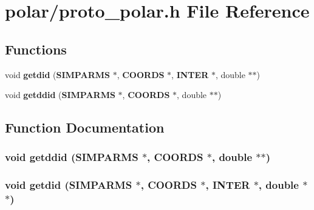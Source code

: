 \section{polar/proto\_\-polar.h File Reference}
\label{polar_2proto__polar_8h}
\subsection*{Functions}
\begin{CompactItemize}
\item 
void {\bf getdid} ({\bf SIMPARMS} $\ast$, {\bf COORDS} $\ast$, {\bf INTER} $\ast$, double $\ast$$\ast$)
\item 
void {\bf getddid} ({\bf SIMPARMS} $\ast$, {\bf COORDS} $\ast$, double $\ast$$\ast$)
\end{CompactItemize}


\subsection{Function Documentation}
\subsubsection{\setlength{\rightskip}{0pt plus 5cm}void getddid ({\bf SIMPARMS} $\ast$, {\bf COORDS} $\ast$, double $\ast$$\ast$)}\label{polar_2proto__polar_8h_ff4215ea1918614a367adf368cf7587a}


\subsubsection{\setlength{\rightskip}{0pt plus 5cm}void getdid ({\bf SIMPARMS} $\ast$, {\bf COORDS} $\ast$, {\bf INTER} $\ast$, double $\ast$$\ast$)}\label{polar_2proto__polar_8h_9e37f2821b8e458aad9fa957fda657b5}


